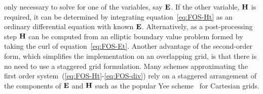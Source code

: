 \documentclass{article}
\begin{document}
only necessary to solve for one of the variables, say $\mathbf{ E}$. 
If the other variable, $\mathbf{ H}$ is required, it can be
determined by
integrating equation~\eqref{eq:FOS-Ht} as an ordinary differential equation
with known $\mathbf{ E}$. Alternatively, as a post-processing step $\mathbf{ H}$ can be computed from an
elliptic boundary value problem formed by taking the curl of equation~\eqref{eq:FOS-Et}.
Another advantage of the second-order form, which simplifies the implementation on
an overlapping grid, is that there is no need to use a staggered grid formulation. 
Many schemes approximating the first order system~(\ref{eq:FOS-Ht}-\ref{eq:FOS-div}) rely on a
staggered arrangement of the components of $\mathbf{ E}$ and $\mathbf{ H}$ such as the
popular Yee scheme~\cite{Yee66} for Cartesian grids. 





\vfill\eject
% 



\printindex
\end{document}
